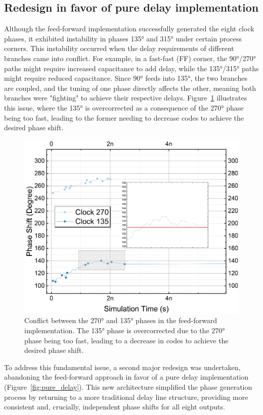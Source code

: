 \subsection{Redesign in favor of pure delay implementation}\label{sec:second_redesign}

Although the feed-forward implementation successfully generated the eight clock phases, it exhibited instability in phases \ang{135} and \ang{315} under certain process corners. This instability occurred when the delay requirements of different branches came into conflict. For example, in a fast-fast (FF) corner, the \ang{90}/\ang{270} paths might require increased capacitance to add delay, while the \ang{135}/\ang{315} paths might require reduced capacitance. Since \ang{90} feeds into \ang{135}, the two branches are coupled, and the tuning of one phase directly affects the other, meaning both branches were "fighting" to achieve their respective delays. Figure~\ref{fig:FF_8out_225vs135} illustrates this issue, where the \ang{135} is overcorrected as a consequence of the \ang{270} phase being too fast, leading to the former needing to decrease codes to achieve the desired phase shift.

\begin{figure}[htbp]
  \centering
  \includegraphics[width=0.6\linewidth]{figures/Results/FF_8out_PNPN-FightExample.png}
  \caption{Conflict between the \ang{270} and \ang{135} phases in the feed-forward implementation. The \ang{135} phase is overcorrected due to the \ang{270} phase being too fast, leading to a decrease in codes to achieve the desired phase shift.}
  \label{fig:FF_8out_225vs135}
\end{figure}

To address this fundamental issue, a second major redesign was undertaken, abandoning the feed-forward approach in favor of a pure delay implementation (Figure~\ref{fig:pure_delay}). This new architecture simplified the phase generation process by returning to a more traditional delay line structure, providing more consistent and, crucially, independent phase shifts for all eight outputs.

